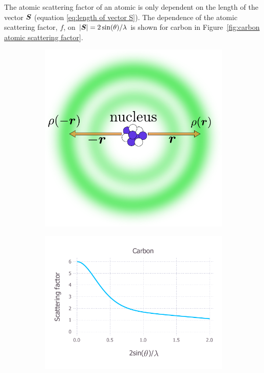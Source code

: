             The atomic scattering factor of an atomic is only dependent on the length of the vector $\boldsymbol{S}$ (equation \ref{eq:length of vector S}).
            The dependence of the atomic scattering factor, $f$, on $|\boldsymbol{S}| = 2\sin(\theta)/\lambda$ is shown for carbon in Figure~\ref{fig:carbon atomic scattering factor}.

            \begin{figure}
                \centering
                \begin{subfigure}[b]{0.4\textwidth}
                        \centering
                        \includegraphics[width=\textwidth]{figures/introduction/atomicelectroncloud.pdf}
                        \caption{}
                        \label{fig:atomic electron cloud}
                \end{subfigure}
                \qquad
                \begin{subfigure}[b]{0.5\textwidth}
                        \centering
                        \includegraphics[width=\textwidth]{figures/introduction/carbonscatfac.pdf}

\end{subfigure}
\end{figure}

